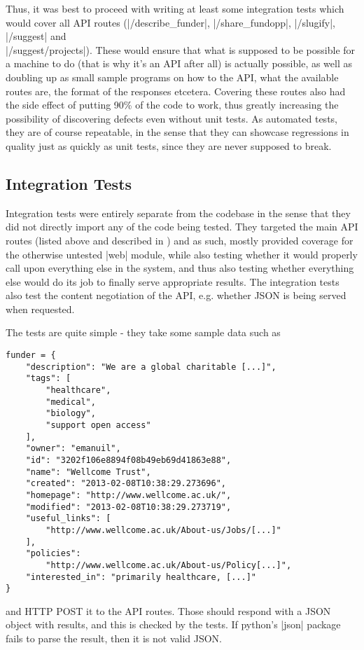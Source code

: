 Thus, it was best to proceed with writing at least some integration tests which would cover all API routes (|/describe_funder|, |/share_fundopp|, |/slugify|, |/suggest| and 
\\|/suggest/projects|). These would ensure that what is supposed to be possible for a machine to do (that is why it's an API after all) is actually possible, as well as doubling up as small sample programs on how to the API, what the available routes are, the format of the responses etcetera. Covering these routes also had the side effect of putting 90\% of the code to work, thus greatly increasing the possibility of discovering defects even without unit tests. As automated tests, they are of course repeatable, in the sense that they can showcase regressions in quality just as quickly as unit tests, since they are never supposed to break.

\subsection{Integration Tests}
Integration tests were entirely separate from the codebase in the sense that they did not directly import any of the code being tested. They targeted the main API routes (listed above and described in ) and as such, mostly provided coverage for the otherwise untested |web| module, while also testing whether it would properly call upon everything else in the system, and thus also testing whether everything else would do its job to finally serve appropriate results. The integration tests also test the content negotiation of the API, e.g. whether JSON is being served when requested.

The tests are quite simple - they take some sample data such as
\begin{verbatim}
funder = {
    "description": "We are a global charitable [...]",
    "tags": [
        "healthcare",
        "medical",
        "biology",
        "support open access"
    ],
    "owner": "emanuil",
    "id": "3202f106e8894f08b49eb69d41863e88",
    "name": "Wellcome Trust",
    "created": "2013-02-08T10:38:29.273696",
    "homepage": "http://www.wellcome.ac.uk/",
    "modified": "2013-02-08T10:38:29.273719",
    "useful_links": [
        "http://www.wellcome.ac.uk/About-us/Jobs/[...]"
    ],
    "policies":
    	"http://www.wellcome.ac.uk/About-us/Policy[...]",
    "interested_in": "primarily healthcare, [...]"
}
\end{verbatim}

and HTTP POST it to the API routes. Those should respond with a JSON object with results, and this is checked by the tests. If python's |json| package fails to parse the result, then it is not valid JSON.

